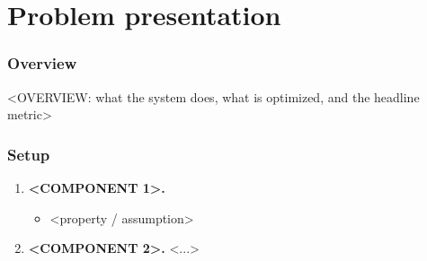 %
%

\part{Problem presentation}

\section{Overview}
<OVERVIEW: what the system does, what is optimized, and the headline metric>

\section{Setup}
\begin{enumerate}
  \item \textbf{<COMPONENT 1>.}
    \begin{itemize}
      \item <property / assumption>
    \end{itemize}
  \item \textbf{<COMPONENT 2>.} <...>
\end{enumerate}

